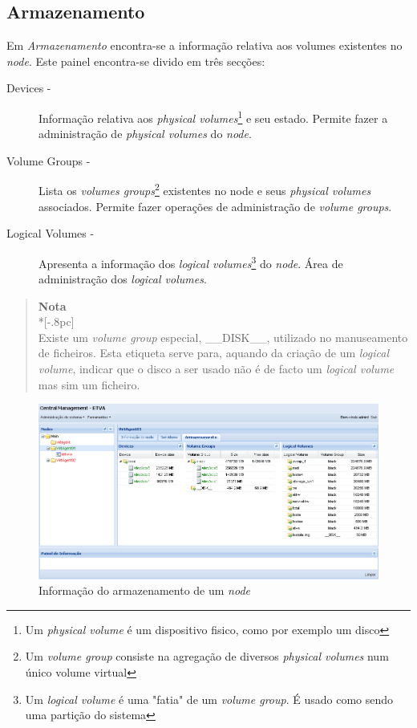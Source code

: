 \subsection{Armazenamento}
\label{sec:storage}

Em \emph{Armazenamento} encontra-se a informação relativa aos volumes existentes no \emph{node}.
Este painel encontra-se divido em três secções:

\begin{description}
	\item[Devices -] Informação relativa aos \emph{physical volumes}\footnote{Um \emph{physical volume} é um dispositivo fisico, como por exemplo um disco} e seu estado. Permite fazer a administração de \emph{physical volumes} do \emph{node}.
	\item[Volume Groups -] Lista os \emph{volumes groups}\footnote{Um \emph{volume group} consiste na agregação de diversos \emph{physical volumes} num único volume virtual} existentes no node e seus \emph{physical volumes} associados. Permite fazer operações de administração de \emph{volume groups}.
	\item[Logical Volumes -] Apresenta a informação dos \emph{logical volumes}\footnote{Um \emph{logical volume} é uma "fatia" de um \emph{volume group}. É usado como sendo uma partição do sistema} do \emph{node}. Área de administração dos \emph{logical volumes}.
\end{description}


\begin{quote}
	{\large \bf Nota} \\*[-.8pc]
	\underline{\hspace{6in}} \\
	Existe um \emph{volume group} especial, \_\_DISK\_\_, utilizado no manuseamento de ficheiros. Esta etiqueta serve para, aquando da criação de um \emph{logical volume}, indicar que o disco a ser usado não é de facto um \emph{logical volume} mas sim um ficheiro.
\end{quote}


\begin{figure}[H]
	\begin{center}
	\includegraphics[scale=0.45]{screenshots/node_storage.png}
	\caption{Informação do armazenamento de um \emph{node}}
	\label{fig:inicial}
	\end{center}
\end{figure}

